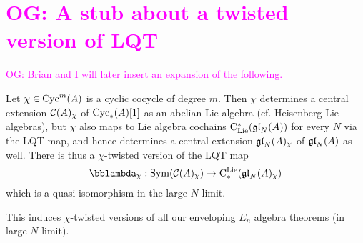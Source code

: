 \documentclass[11pt]{amsart}
\numberwithin{equation}{section}
\def\brian{\textcolor{blue}{BW: }\textcolor{blue}}
\def\owen{\textcolor{magenta}{OG: }\textcolor{magenta}}
\begin{document}
\section{\owen{A stub about a twisted version of LQT}}

\owen{Brian and I will later insert an expansion of the following.}

Let $\chi \in {\rm Cyc}^m(A)$ is a cyclic cocycle of degree $m$. 
Then $\chi$ determines a central extension $\mathcal C(A)_\chi$ of ${\rm Cyc}_*(A)[1]$ as an abelian Lie algebra (cf. Heisenberg Lie algebras),
but $\chi$ also maps to Lie algebra cochains ${\rm C}_{\rm Lie}^*(\frak{gl}_N(A))$ for every $N$ via the LQT map,
and hence determines a central extension $\frak{gl}_N(A)_\chi$ of $\frak{gl}_N(A)$ as well.
There is thus a $\chi$-twisted version of the LQT map
\[
\lqt_\chi: \Sym(\cC(A)_\chi) \to \cliels(\gl_N(A)_\chi)
\]
which is a quasi-isomorphism in the large $N$ limit.

This induces $\chi$-twisted versions of all our enveloping $E_n$ algebra theorems (in large $N$ limit).

%



  


%  
\end{document}
